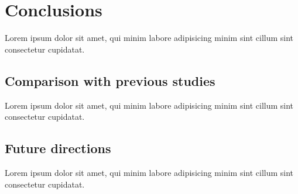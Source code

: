 \chapter{Conclusions}
\label{chap:conclusion}

Lorem ipsum dolor sit amet, qui minim labore adipisicing minim sint cillum sint consectetur cupidatat.

\section{Comparison with previous studies}

Lorem ipsum dolor sit amet, qui minim labore adipisicing minim sint cillum sint consectetur cupidatat.

\section{Future directions}

Lorem ipsum dolor sit amet, qui minim labore adipisicing minim sint cillum sint consectetur cupidatat.
